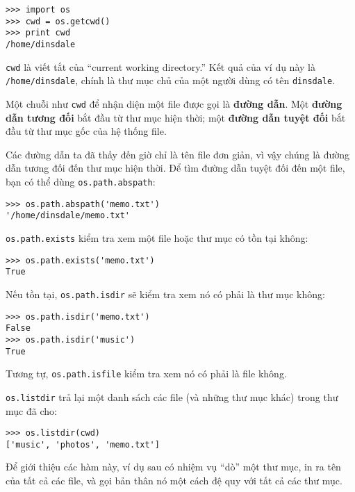 \documentclass[11pt]{book}
\begin{document}

\beforeverb
\begin{verbatim}
>>> import os
>>> cwd = os.getcwd()
>>> print cwd
/home/dinsdale
\end{verbatim}
\afterverb
%
{\tt cwd} là viết tắt của ``current working directory.''  Kết quả của 
ví dụ này là {\tt /home/dinsdale}, chính là thư mục chủ của
một người dùng có tên {\tt dinsdale}.


Một chuỗi như {\tt cwd} để nhận diện một file được gọi là {\bf đường dẫn}.
Một {\bf đường dẫn tương đối} bắt đầu từ thư mục hiện thời;
một {\bf đường dẫn tuyệt đối} bắt đầu từ thư mục gốc của 
hệ thống file.


Các đường dẫn ta đã thấy đến giờ chỉ là tên file đơn giản, vì vậy
chúng là đường dẫn tương đối đến thư mục hiện thời. Để tìm
đường dẫn tuyệt đối đến một file, bạn có thể dùng {\tt os.path.abspath}:

\beforeverb
\begin{verbatim}
>>> os.path.abspath('memo.txt')
'/home/dinsdale/memo.txt'
\end{verbatim}
\afterverb
%
{\tt os.path.exists} kiểm tra xem một file hoặc thư mục có tồn tại không:


\beforeverb
\begin{verbatim}
>>> os.path.exists('memo.txt')
True
\end{verbatim}
\afterverb
%
Nếu tồn tại, {\tt os.path.isdir} sẽ kiểm tra xem nó có phải là thư mục không:

\beforeverb
\begin{verbatim}
>>> os.path.isdir('memo.txt')
False
>>> os.path.isdir('music')
True
\end{verbatim}
\afterverb
%
Tương tự, {\tt os.path.isfile} kiểm tra xem nó có phải là file không.

{\tt os.listdir} trả lại một danh sách các file (và những thư mục khác)
trong thư mục đã cho:

\beforeverb
\begin{verbatim}
>>> os.listdir(cwd)
['music', 'photos', 'memo.txt']
\end{verbatim}
\afterverb
%
Để giới thiệu các hàm này, ví dụ sau có nhiệm vụ ``dò'' một
thư mục, in ra tên của tất cả các file, và gọi bản thân nó một cách
đệ quy với tất cả các thư mục.
\end{document}

